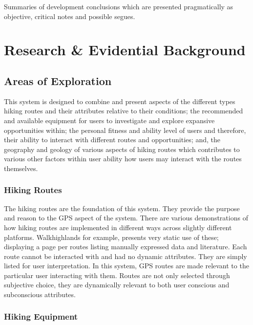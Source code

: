\documentclass[11pt, english]{article}
\begin{document}
	Summaries of development conclusions which are presented pragmatically as objective, critical notes and possible segues.

\newpage

\section{Research \& Evidential Background}\label{ch2}

	\subsection{Areas of Exploration}

	This system is designed to combine and present aspects of the different types hiking routes and their attributes relative to their conditions; the recommended and available equipment for users to investigate and explore expansive opportunities within; the personal fitness and ability level of users and therefore, their ability to interact with different routes and opportunities; and, the geography and geology of various aspects of hiking routes which contributes to various other factors within user ability how users may interact with the routes themselves. 

		\subsubsection{Hiking Routes}

		The hiking routes are the foundation of this system. They provide the purpose and reason to the GPS aspect of the system. There are various demonstrations of how hiking routes are implemented in different ways across slightly different platforms. Walkhighlands for example, presents very static use of these; displaying a page per routes listing manually expressed data and literature. Each route cannot be interacted with and had no dynamic attributes. They are simply listed for user interpretation. In this system, GPS routes are made relevant to the particular user interacting with them. Routes are not only selected through subjective choice, they are dynamically relevant to both user conscious and subconscious attributes.

		\subsubsection{Hiking Equipment}
\end{document}
